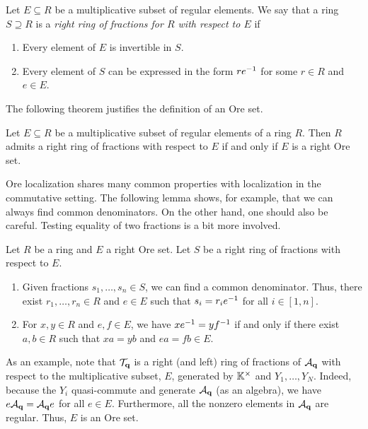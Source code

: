 Let $E \subseteq R$ be a multiplicative subset of regular elements. We say that a ring
$S \supseteq R$ is a \emph{right ring of fractions for $R$ with respect to
	$E$} if
\begin{enumerate}
	\item Every element of $E$ is invertible in $S$.
	\item Every element of $S$ can be expressed in the form $re^{-1}$ for some $r \in R$ and $e
		      \in E$.
\end{enumerate}
The following theorem justifies the definition of an Ore set.
\begin{theorem}
	Let $E \subseteq R$ be a multiplicative subset of regular elements of a ring $R$. Then $R$ admits a right ring of fractions with respect to $E$ if and only if $E$ is a right Ore set.
\end{theorem}
%
Ore localization shares many common properties with localization in the commutative
setting. The following lemma shows, for example, that we can always find common
denominators. On the other hand, one should also be careful. Testing equality of two
fractions is a bit more involved.
\begin{lemma}\label{lem:ore_set_properties}
	Let $R$ be a ring and $E$ a right Ore set. Let $S$ be a right ring of fractions with respect to $E$.
	\begin{enumerate}
		\item Given fractions $s_1, \dots, s_n \in S$, we can find a common denominator. Thus, there
		      exist $r_1, \dots, r_n \in R$ and $e \in E$ such that $s_i = r_i e^{-1}$ for all $i \in
			      [1, n]$.
		\item For $x, y \in R$ and $e, f \in E$, we have $x e ^{-1} = y f ^{-1}$ if and only if there
		      exist $a,b \in R$ such that $xa = yb$ and $ea = fb \in E$.
	\end{enumerate}
\end{lemma}

As an example, note that $\mathcal{T}_{\mathbf{q}}$ is a right (and left) ring of fractions of
$\mathcal{A}_{\mathbf{q}}$ with respect to the multiplicative subset, $E$, generated by $\mathbb{K}^\times$
and $Y_1, \dots, Y_N$. Indeed, because the $Y_i$ quasi-commute and generate $\mathcal{A}_{\mathbf{q}}$
(as an algebra), we have $e \mathcal{A}_{\mathbf{q}} = \mathcal{A}_{\mathbf{q}} e$ for all $e \in E$. Furthermore,
all the nonzero elements in $\mathcal{A}_{\mathbf{q}}$ are regular. Thus, $E$ is an Ore set.

